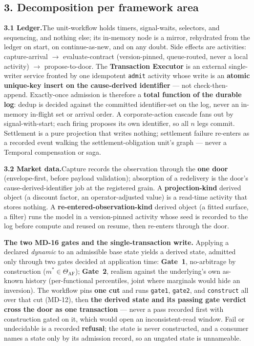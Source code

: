 \documentclass[11pt,a4paper]{article}
\begin{document}
\subsection*{3. Decomposition per framework area}

\textbf{3.1 Ledger.}\quad The unit-workflow holds timers, signal-waits, selectors, and sequencing,
and nothing else; its in-memory node is a mirror, rehydrated from the ledger on start, on
continue-as-new, and on any doubt. Side effects are activities: capture-arrival $\to$
evaluate-contract (version-pinned, queue-routed, never a local activity) $\to$ propose-to-door. The
\textbf{Transaction Executor} is an external single-writer service fronted by one idempotent
\texttt{admit} activity whose write is an \textbf{atomic unique-key insert on the cause-derived
identifier} --- not check-then-append. Exactly-once admission is therefore a \textbf{total function of
the durable log}: dedup is decided against the committed identifier-set on the log, never an in-memory
in-flight set or arrival order. A corporate-action cascade fans out by signal-with-start; each firing
proposes its own identifier, so all $n$ legs commit. Settlement is a pure projection that writes
nothing; settlement failure re-enters as a recorded event walking the settlement-obligation unit's
graph --- never a Temporal compensation or saga.

\textbf{3.2 Market data.}\quad Capture records the observation through the \textbf{one door}
(envelope-first, before payload validation); absorption of a redelivery is the door's
cause-derived-identifier job at the registered grain. A \textbf{projection-kind} derived object (a
discount factor, an operator-adjusted value) is a read-time activity that stores nothing. A
\textbf{re-entered-observation-kind} derived object (a fitted surface, a filter) runs the model in a
version-pinned activity whose seed is recorded to the log before compute and reused on resume, then
re-enters through the door.

\textbf{The two MD-16 gates and the single-transaction write.} Applying a declared \emph{dynamic} to
an admissible base state yields a derived state, admitted only through two gates decided at
application time: \textbf{Gate~1}, no-arbitrage by construction ($m^\ast \in \Theta_{\mathrm{AF}}$);
\textbf{Gate~2}, realism against the underlying's own as-known history (per-functional percentiles,
joint where marginals would hide an inversion). The workflow pins \textbf{one cut} and runs
\texttt{gate1}, \texttt{gate2}, and \texttt{construct} all over that cut (MD-12), then \textbf{the
derived state and its passing gate verdict cross the door as one transaction} --- never a pass
recorded first with construction gated on it, which would open an inconsistent-read window. Fail or
undecidable is a recorded \textbf{refusal}; the state is never constructed, and a consumer names a
state only by its admission record, so an ungated state is unnameable.
\end{document}
